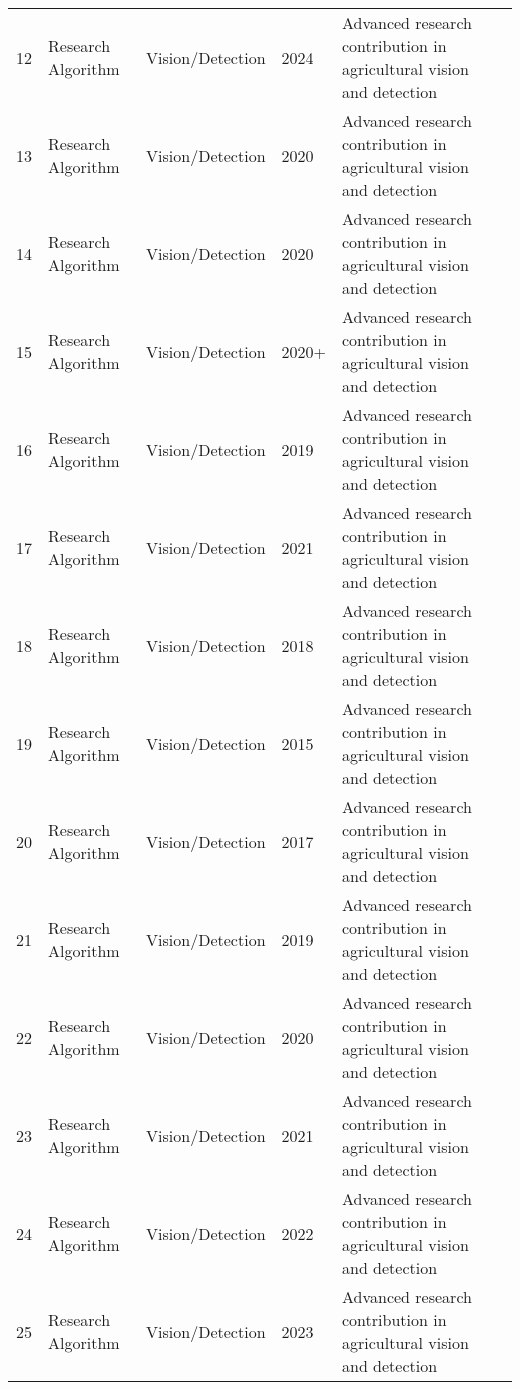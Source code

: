 \begin{table*}[htbp]
\begin{tabular}{p{}p{}p{}p{}p{}p{}}
 12 & Research Algorithm & Vision/Detection & 2024 & Advanced research contribution in agricultural vision and detection & \cite{BILDSTEIN2024104754} \\
 13 & Research Algorithm & Vision/Detection & 2020 & Advanced research contribution in agricultural vision and detection & \cite{birrell2020field} \\
 14 & Research Algorithm & Vision/Detection & 2020 & Advanced research contribution in agricultural vision and detection & \cite{bochkovskiy2020yolov4} \\
 15 & Research Algorithm & Vision/Detection & 2020+ & Advanced research contribution in agricultural vision and detection & \cite{borenstein1991vfh} \\
 16 & Research Algorithm & Vision/Detection & 2019 & Advanced research contribution in agricultural vision and detection & \cite{bresilla2019single} \\
 17 & Research Algorithm & Vision/Detection & 2021 & Advanced research contribution in agricultural vision and detection & \cite{burks2021engineering} \\
 18 & Research Algorithm & Vision/Detection & 2018 & Advanced research contribution in agricultural vision and detection & \cite{cai2018cascade} \\
 19 & Research Algorithm & Vision/Detection & 2015 & Advanced research contribution in agricultural vision and detection & \cite{chen2015design} \\
 20 & Research Algorithm & Vision/Detection & 2017 & Advanced research contribution in agricultural vision and detection & \cite{chen2017design} \\
 21 & Research Algorithm & Vision/Detection & 2019 & Advanced research contribution in agricultural vision and detection & \cite{chen2019design} \\
 22 & Research Algorithm & Vision/Detection & 2020 & Advanced research contribution in agricultural vision and detection & \cite{chen2020design} \\
 23 & Research Algorithm & Vision/Detection & 2021 & Advanced research contribution in agricultural vision and detection & \cite{chen2021design} \\
 24 & Research Algorithm & Vision/Detection & 2022 & Advanced research contribution in agricultural vision and detection & \cite{chen2022design} \\
 25 & Research Algorithm & Vision/Detection & 2023 & Advanced research contribution in agricultural vision and detection & \cite{chen2023design} \\

\end{tabular}
\end{table*}
